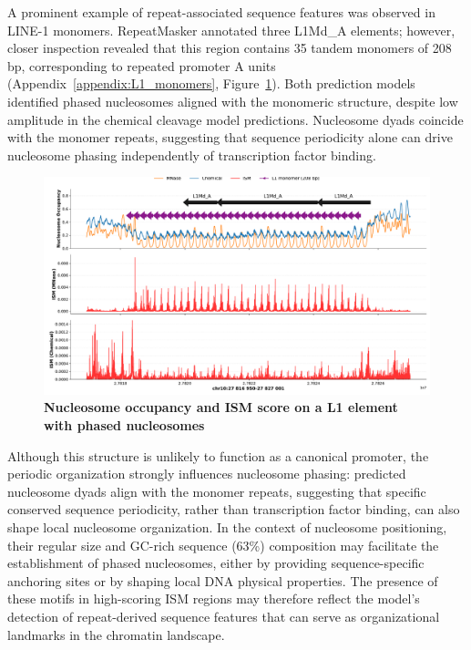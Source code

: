 \documentclass[11pt]{book}
\begin{document}
\FloatBarrier
A prominent example of repeat-associated sequence features was observed in LINE-1 monomers. RepeatMasker annotated three L1Md\_A elements; however, closer inspection revealed that this region contains 35 tandem monomers of 208 bp, corresponding to repeated promoter A units (Appendix~\ref{appendix:L1_monomers}, Figure~\ref{fig:l1_monomer}). Both prediction models identified phased nucleosomes aligned with the monomeric structure, despite low amplitude in the chemical cleavage model predictions. Nucleosome dyads coincide with the monomer repeats, suggesting that sequence periodicity alone can drive nucleosome phasing independently of transcription factor binding.

\begin{figure}[htbp]
    \centering
    \includegraphics[width=\textwidth]{Figures/Results/L1_monomer_example.pdf}
    \caption{\textbf{Nucleosome occupancy and ISM score on a L1 element with phased nucleosomes}}
    \label{fig:l1_monomer}
\end{figure}

Although this structure is unlikely to function as a canonical promoter, the periodic organization strongly influences nucleosome phasing: predicted nucleosome dyads align with the monomer repeats, suggesting that specific conserved sequence periodicity, rather than transcription factor binding, can also shape local nucleosome organization. In the context of nucleosome positioning, their regular size and GC-rich sequence (63\%) composition may facilitate the establishment of phased nucleosomes, either by providing sequence-specific anchoring sites or by shaping local DNA physical properties. The presence of these motifs in high-scoring ISM regions may therefore reflect the model’s detection of repeat-derived sequence features that can serve as organizational landmarks in the chromatin landscape.
\end{document}
